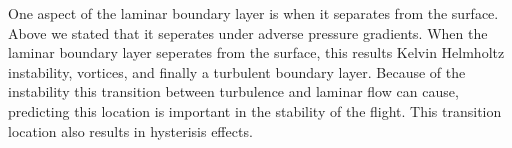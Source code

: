 One aspect of the laminar boundary layer is when it separates from the surface.
Above we stated that it seperates under adverse pressure gradients. When the
laminar boundary layer seperates from the surface, this results Kelvin
Helmholtz instability, vortices, and finally a turbulent boundary layer. 
Because of the instability this transition between turbulence and laminar flow 
can cause, predicting this location is important in the stability of the flight.
This transition location also results in hysterisis effects.
